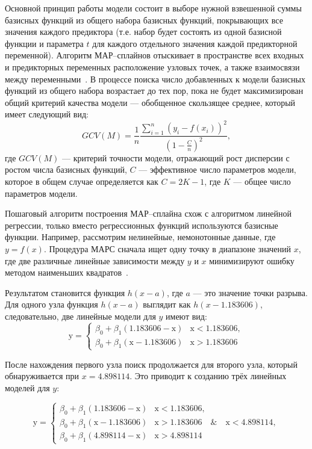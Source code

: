 Основной принцип работы модели состоит в выборе нужной взвешенной суммы базисных функций из общего набора базисных функций, покрывающих все значения каждого предиктора (т.е. набор будет состоять из одной базисной функции и параметра $t$ для каждого отдельного значения каждой предикторной переменной).
Алгоритм МАР--сплайнов отыскивает в пространстве всех входных и предикторных переменных расположение узловых точек, а также взаимосвязи между переменными~\cite{romanova}.
В процессе поиска число добавленных к модели базисных функций из общего набора возрастает до тех пор, пока не будет максимизирован общий критерий качества модели --- обобщенное скользящее среднее, который имеет следующий вид:
\begin{equation}
    GCV(M) = \frac{1}{n} \frac{\sum_{i=1}^{n} (y_i - f(x_i))^2}{(1 - \frac{C}{n})^2},
\end{equation}
где $GCV(M)$ --- критерий точности модели, отражающий рост дисперсии с ростом числа базисных функций, $C$ --- эффективное число параметров модели, которое в общем случае определяется как $C = 2K - 1$, где $K$ --- общее число параметров модели.

Пошаговый алгоритм построения МАР--сплайна схож с алгоритмом линейной регрессии, только вместо регрессионных функций используются базисные функции.
Например, рассмотрим нелинейные, немонотонные данные, где $y = f(x)$.
Процедура МАРС сначала ищет одну точку в диапазоне значений $x$, где две различные линейные зависимости между $y$ и $x$ минимизируют ошибку методом наименьших квадратов~\cite{gitbook}.

Результатом становится функция $h(x - a)$, где $a$ --- это значение точки разрыва.
Для одного узла функция $h(x - a)$ выглядит как $h(x - 1.183606)$, следовательно, две линейные модели для $y$ имеют вид:
\begin{equation}
  \text{y} =
  \begin{cases}
    \beta_0 + \beta_1(1.183606 - \text{x}) & \text{x} < 1.183606, \\
    \beta_0 + \beta_1(\text{x} - 1.183606) & \text{x} > 1.183606
  \end{cases}
\end{equation}

После нахождения первого узла поиск продолжается для второго узла, который обнаруживается при $x = 4.898114$.
Это приводит к созданию трёх линейных моделей для $y$:

\begin{equation}
  \text{y} =
  \begin{cases}
    \beta_0 + \beta_1(1.183606 - \text{x}) & \text{x} < 1.183606, \\
    \beta_0 + \beta_1(\text{x} - 1.183606) & \text{x} > 1.183606 \quad \& \quad \text{x} < 4.898114, \\
    \beta_0 + \beta_1(4.898114 - \text{x}) & \text{x} > 4.898114
  \end{cases}
\end{equation}

